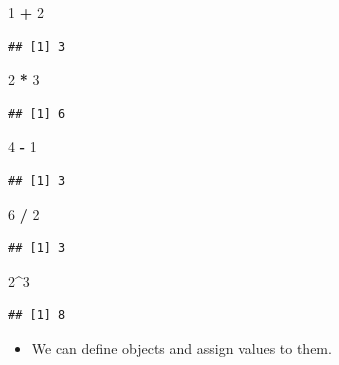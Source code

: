 \documentclass[]{book}
\newenvironment{Shaded}{\begin{snugshade}}{\end{snugshade}}
\newcommand{\DecValTok}[1]{\textcolor[rgb]{0.00,0.00,0.81}{#1}}
\newcommand{\StringTok}[1]{\textcolor[rgb]{0.31,0.60,0.02}{#1}}
\newcommand{\OperatorTok}[1]{\textcolor[rgb]{0.81,0.36,0.00}{\textbf{#1}}}
\providecommand{\tightlist}{%
  \setlength{\itemsep}{0pt}\setlength{\parskip}{0pt}}
\theoremstyle{definition}
\theoremstyle{definition}
\theoremstyle{definition}
\theoremstyle{remark}
\begin{document}
\begin{Shaded}
\begin{Highlighting}[]
\DecValTok{1} \OperatorTok{+}\StringTok{ }\DecValTok{2}
\end{Highlighting}
\end{Shaded}

\begin{verbatim}
## [1] 3
\end{verbatim}

\begin{Shaded}
\begin{Highlighting}[]
\DecValTok{2} \OperatorTok{*}\StringTok{ }\DecValTok{3}
\end{Highlighting}
\end{Shaded}

\begin{verbatim}
## [1] 6
\end{verbatim}

\begin{Shaded}
\begin{Highlighting}[]
\DecValTok{4} \OperatorTok{-}\StringTok{ }\DecValTok{1}
\end{Highlighting}
\end{Shaded}

\begin{verbatim}
## [1] 3
\end{verbatim}

\begin{Shaded}
\begin{Highlighting}[]
\DecValTok{6} \OperatorTok{/}\StringTok{ }\DecValTok{2}
\end{Highlighting}
\end{Shaded}

\begin{verbatim}
## [1] 3
\end{verbatim}

\begin{Shaded}
\begin{Highlighting}[]
\DecValTok{2}\OperatorTok{^}\DecValTok{3}
\end{Highlighting}
\end{Shaded}

\begin{verbatim}
## [1] 8
\end{verbatim}

\begin{itemize}
\tightlist
\item
  We can define objects and assign values to them.
\end{itemize}
\end{document}
